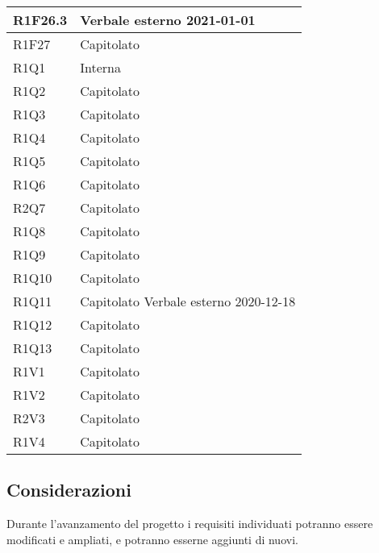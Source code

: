 \begin{center}
\begin{longtable}{|p{22mm}|p{22mm}|}
\\
\hline
R1F26.3 &
Verbale esterno 2021-01-01 \newline
\\
\hline
R1F27 &
Capitolato \newline
\\
\hline
R1Q1 &
Interna \newline
\\
\hline
R1Q2 &
Capitolato \newline
\\
\hline
R1Q3 &
Capitolato \newline
\\
\hline
R1Q4 &
Capitolato \newline
\\
\hline
R1Q5 &
Capitolato \newline
\\
\hline
R1Q6 &
Capitolato \newline
\\
\hline
R2Q7 &
Capitolato \newline
\\
\hline
R1Q8 &
Capitolato \newline
\\
\hline
R1Q9 &
Capitolato \newline
\\
\hline
R1Q10 &
Capitolato \newline
\\
\hline
R1Q11 &
Capitolato \newline
Verbale esterno 2020-12-18 \newline
\\
\hline
R1Q12 &
Capitolato \newline
\\
\hline
R1Q13 &
Capitolato \newline
\\
\hline
R1V1 &
Capitolato \newline
\\
\hline
R1V2 &
Capitolato \newline
\\
\hline
R2V3 &
Capitolato \newline
\\
\hline
R1V4 &
Capitolato \newline
\\
\hline
	
	\end{longtable}
\end{center}

\subsection{Considerazioni}
Durante l'avanzamento del progetto i requisiti individuati potranno essere modificati e ampliati, e potranno esserne aggiunti di nuovi.